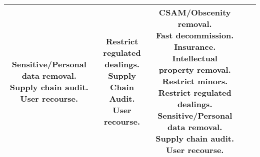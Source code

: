 \documentclass[fleqn]{article}
\begin{document}
\begin{landscape}
\begin{table}[H]
\begin{tabular}{|c|c|c|c|c|}
{			\textbullet\hspace{3pt} Sensitive/Personal data removal. \\ 	
			\textbullet\hspace{3pt} Supply chain audit. \\ 	
			\textbullet\hspace{3pt} User recourse. \\   
		}
		& \makecell[l]{	
			\textbullet\hspace{3pt} Restrict regulated dealings. \\ 		
			\textbullet\hspace{3pt} Supply Chain Audit. \\ 	
			\textbullet\hspace{3pt} User recourse. \\  
		}
		& \makecell[l]{
			\textbullet\hspace{3pt} CSAM/Obscenity removal. \\ 	
			\textbullet\hspace{3pt} Fast decommission. \\ 	
			\textbullet\hspace{3pt} Insurance. \\ 	
			\textbullet\hspace{3pt} Intellectual property removal. \\ 		
			\textbullet\hspace{3pt} Restrict minors. \\ 	
			\textbullet\hspace{3pt} Restrict regulated dealings. \\ 	
			\textbullet\hspace{3pt} Sensitive/Personal data removal. \\ 	
			\textbullet\hspace{3pt} Supply chain audit. \\ 	
			\textbullet\hspace{3pt} User recourse. \\   		 
		}
		\\
		\hline
	\end{tabular}
	\label{table:high_risk_plan_by_tc}
\end{table}

\vfill
\raisebox{-10pt}{\makebox[\linewidth]{\thepage}}

\pagebreak
\thispagestyle{empty}


\end{landscape}
\end{document}
